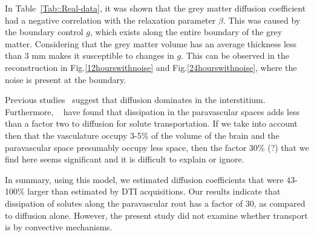 \documentclass[11pt,a4paper]{article}
\begin{document}
In Table~\ref{Tab::Real-data}, it was shown that the grey matter diffusion coefficient had a negative correlation with the relaxation parameter $\beta$. This was caused by the boundary control $g$, which exists along the entire boundary of the grey matter. Considering that the grey matter volume has an average thickness less than 3 mm makes it susceptible to changes in $g$. This can be observed in the reconstruction in Fig.\ref{12hourswithnoise} and Fig.\ref{24hourswithnoise}, where the noise is present at the boundary.
  
Previous studies~\cite{holter2017interstitial, smith2017glymphatic} suggest that diffusion dominates in the interstitium. Furthermore, 
~\cite{asgari2016glymphatic, brynjfm, Diem} have found that dissipation in the paravascular spaces adds less than a factor two
to diffusion for solute transportation. If we take into account then that the vasculature occupy 3-5\% of the volume
of the brain and the paravascular space presumably occupy less space, then the factor 30\% (?) that we find here 
seems significant and it is difficult to explain or ignore.      

In summary, using this model, we estimated diffusion coefficients that were 43-100\% larger than estimated by DTI acquisitions. Our results indicate that dissipation of solutes along the paravascular rout has a factor of 30, as compared to diffusion alone. However, the present study did not examine whether transport is by convective mechanisms.


 

\end{document}
